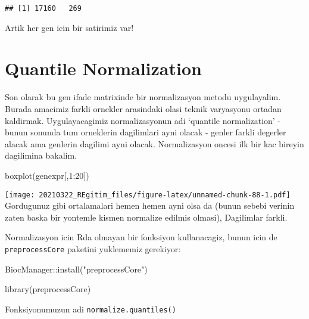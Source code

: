 \documentclass[
]{book}
\newenvironment{Shaded}{\begin{snugshade}}{\end{snugshade}}
\newcommand{\DecValTok}[1]{\textcolor[rgb]{0.00,0.00,0.81}{#1}}
\newcommand{\FunctionTok}[1]{\textcolor[rgb]{0.00,0.00,0.00}{#1}}
\newcommand{\NormalTok}[1]{#1}
\newcommand{\SpecialCharTok}[1]{\textcolor[rgb]{0.00,0.00,0.00}{#1}}
\newcommand{\StringTok}[1]{\textcolor[rgb]{0.31,0.60,0.02}{#1}}
\begin{document}
\begin{verbatim}
## [1] 17160   269
\end{verbatim}

Artik her gen icin bir satirimiz var!

\hypertarget{quantile-normalization}{%
\section{Quantile Normalization}\label{quantile-normalization}}

Son olarak bu gen ifade matrixinde bir normalizasyon metodu uygulayalim. Burada amacimiz farkli ornekler arasindaki olasi teknik varyasyonu ortadan kaldirmak. Uygulayacagimiz normalizasyonun adi `quantile normalization' - bunun sonunda tum orneklerin dagilimlari ayni olacak - genler farkli degerler alacak ama genlerin dagilimi ayni olacak. Normalizasyon oncesi ilk bir kac bireyin dagilimina bakalim.

\begin{Shaded}
\begin{Highlighting}[]
\FunctionTok{boxplot}\NormalTok{(genexpr[,}\DecValTok{1}\SpecialCharTok{:}\DecValTok{20}\NormalTok{])}
\end{Highlighting}
\end{Shaded}

\texttt{[image: 20210322\_REgitim\_files/figure-latex/unnamed-chunk-88-1.pdf]}
Gordugunuz gibi ortalamalari hemen hemen ayni olsa da (bunun sebebi verinin zaten baska bir yontemle kismen normalize edilmis olmasi), Dagilimlar farkli.

Normalizasyon icin Rda olmayan bir fonksiyon kullanacagiz, bunun icin de \texttt{preprocessCore} paketini yuklememiz gerekiyor:

\begin{Shaded}
\begin{Highlighting}[]
\NormalTok{BiocManager}\SpecialCharTok{::}\FunctionTok{install}\NormalTok{(}\StringTok{"preprocessCore"}\NormalTok{)}
\end{Highlighting}
\end{Shaded}

\begin{Shaded}
\begin{Highlighting}[]
\FunctionTok{library}\NormalTok{(preprocessCore)}
\end{Highlighting}
\end{Shaded}

Fonksiyonumuzun adi \texttt{normalize.quantiles()}
\end{document}
